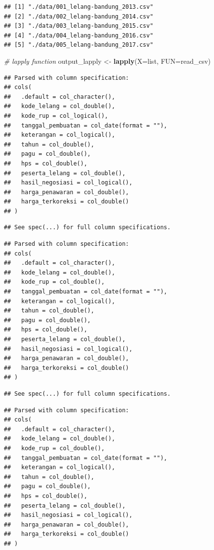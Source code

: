 \documentclass[]{book}
\newenvironment{Shaded}{\begin{snugshade}}{\end{snugshade}}
\newcommand{\KeywordTok}[1]{\textcolor[rgb]{0.13,0.29,0.53}{\textbf{#1}}}
\newcommand{\DataTypeTok}[1]{\textcolor[rgb]{0.13,0.29,0.53}{#1}}
\newcommand{\StringTok}[1]{\textcolor[rgb]{0.31,0.60,0.02}{#1}}
\newcommand{\CommentTok}[1]{\textcolor[rgb]{0.56,0.35,0.01}{\textit{#1}}}
\newcommand{\NormalTok}[1]{#1}
\begin{document}
\begin{verbatim}
## [1] "./data/001_lelang-bandung_2013.csv"
## [2] "./data/002_lelang-bandung_2014.csv"
## [3] "./data/003_lelang-bandung_2015.csv"
## [4] "./data/004_lelang-bandung_2016.csv"
## [5] "./data/005_lelang-bandung_2017.csv"
\end{verbatim}

\begin{Shaded}
\begin{Highlighting}[]
\CommentTok{# lapply function}
\NormalTok{output_lapply <-}\StringTok{ }\KeywordTok{lapply}\NormalTok{(}\DataTypeTok{X=}\NormalTok{list, }\DataTypeTok{FUN=}\NormalTok{read_csv)}
\end{Highlighting}
\end{Shaded}

\begin{verbatim}
## Parsed with column specification:
## cols(
##   .default = col_character(),
##   kode_lelang = col_double(),
##   kode_rup = col_logical(),
##   tanggal_pembuatan = col_date(format = ""),
##   keterangan = col_logical(),
##   tahun = col_double(),
##   pagu = col_double(),
##   hps = col_double(),
##   peserta_lelang = col_double(),
##   hasil_negosiasi = col_logical(),
##   harga_penawaran = col_double(),
##   harga_terkoreksi = col_double()
## )
\end{verbatim}

\begin{verbatim}
## See spec(...) for full column specifications.
\end{verbatim}

\begin{verbatim}
## Parsed with column specification:
## cols(
##   .default = col_character(),
##   kode_lelang = col_double(),
##   kode_rup = col_double(),
##   tanggal_pembuatan = col_date(format = ""),
##   keterangan = col_logical(),
##   tahun = col_double(),
##   pagu = col_double(),
##   hps = col_double(),
##   peserta_lelang = col_double(),
##   hasil_negosiasi = col_logical(),
##   harga_penawaran = col_double(),
##   harga_terkoreksi = col_double()
## )
\end{verbatim}

\begin{verbatim}
## See spec(...) for full column specifications.
\end{verbatim}

\begin{verbatim}
## Parsed with column specification:
## cols(
##   .default = col_character(),
##   kode_lelang = col_double(),
##   kode_rup = col_double(),
##   tanggal_pembuatan = col_date(format = ""),
##   keterangan = col_logical(),
##   tahun = col_double(),
##   pagu = col_double(),
##   hps = col_double(),
##   peserta_lelang = col_double(),
##   hasil_negosiasi = col_logical(),
##   harga_penawaran = col_double(),
##   harga_terkoreksi = col_double()
## )
\end{verbatim}
\end{document}
